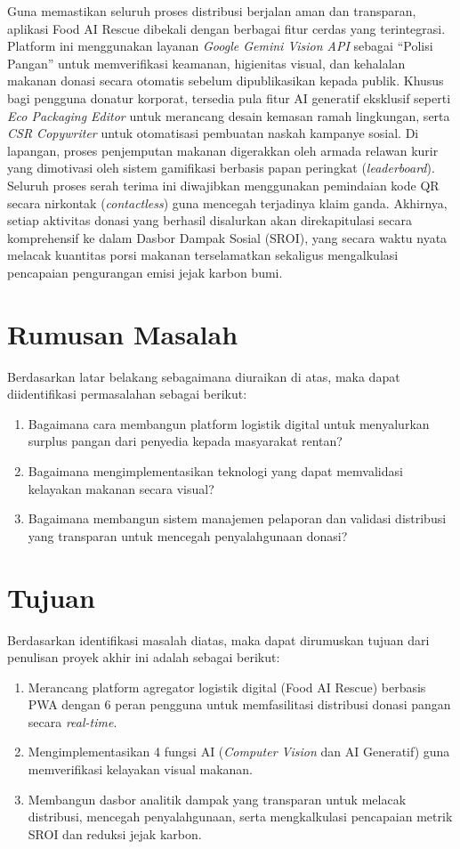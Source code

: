 Guna memastikan seluruh proses distribusi berjalan aman dan transparan, aplikasi Food AI Rescue dibekali dengan berbagai fitur cerdas yang terintegrasi. Platform ini menggunakan layanan \textit{Google Gemini Vision API} sebagai ``Polisi Pangan'' untuk memverifikasi keamanan, higienitas visual, dan kehalalan makanan donasi secara otomatis sebelum dipublikasikan kepada publik. Khusus bagi pengguna donatur korporat, tersedia pula fitur AI generatif eksklusif seperti \textit{Eco Packaging Editor} untuk merancang desain kemasan ramah lingkungan, serta \textit{CSR Copywriter} untuk otomatisasi pembuatan naskah kampanye sosial. Di lapangan, proses penjemputan makanan digerakkan oleh armada relawan kurir yang dimotivasi oleh sistem gamifikasi berbasis papan peringkat (\textit{leaderboard}). Seluruh proses serah terima ini diwajibkan menggunakan pemindaian kode QR secara nirkontak (\textit{contactless}) guna mencegah terjadinya klaim ganda. Akhirnya, setiap aktivitas donasi yang berhasil disalurkan akan direkapitulasi secara komprehensif ke dalam Dasbor Dampak Sosial (SROI), yang secara waktu nyata melacak kuantitas porsi makanan terselamatkan sekaligus mengalkulasi pencapaian pengurangan emisi jejak karbon bumi.


\section{Rumusan Masalah}
Berdasarkan latar belakang sebagaimana diuraikan di atas, maka dapat diidentifikasi permasalahan sebagai berikut:
\begin{enumerate}
\item Bagaimana cara membangun platform logistik digital untuk menyalurkan surplus pangan dari penyedia kepada masyarakat rentan?
\item Bagaimana mengimplementasikan teknologi yang dapat memvalidasi kelayakan makanan secara visual?
\item Bagaimana membangun sistem manajemen pelaporan dan validasi distribusi yang transparan untuk mencegah penyalahgunaan donasi?
\end{enumerate}

\section{Tujuan}
Berdasarkan identifikasi masalah diatas, maka dapat dirumuskan tujuan dari penulisan proyek akhir ini adalah sebagai berikut:
\begin{enumerate}
    \item Merancang platform agregator logistik digital (Food AI Rescue) berbasis PWA dengan 6 peran pengguna untuk memfasilitasi distribusi donasi pangan secara \textit{real-time}.
    \item Mengimplementasikan 4 fungsi AI (\textit{Computer Vision} dan AI Generatif) guna memverifikasi kelayakan visual makanan.
    \item Membangun dasbor analitik dampak yang transparan untuk melacak distribusi, mencegah penyalahgunaan, serta mengkalkulasi pencapaian metrik SROI dan reduksi jejak karbon.
\end{enumerate}

